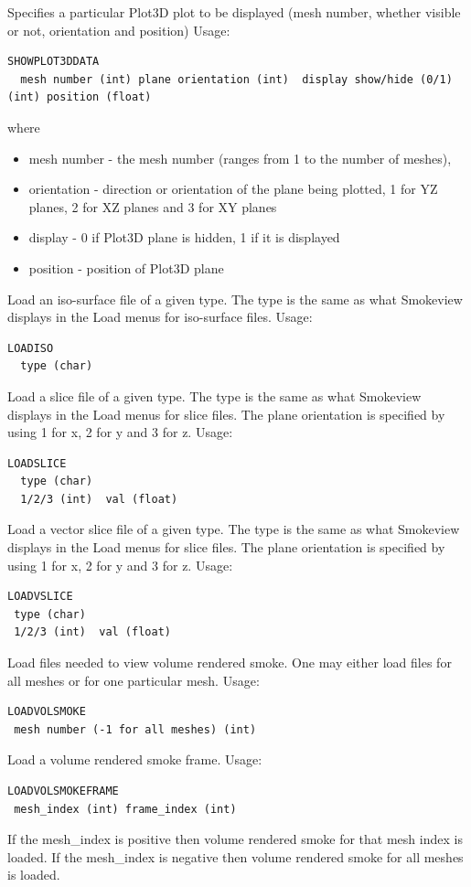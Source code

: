 \documentclass[11pt,twoside]{book}
\newcommand{\hitem}[1]{\item[{\bf #1} \hfill]}
\begin{document}
\hitem{SHOWPLOT3DDATA}Specifies a particular Plot3D plot to be displayed (mesh number, whether visible or not, orientation and position)
Usage:
\begin{lstlisting}
SHOWPLOT3DDATA
  mesh number (int) plane orientation (int)  display show/hide (0/1) (int) position (float)
\end{lstlisting}
where
\begin{itemize}
\item mesh number - the mesh number (ranges from 1 to the number of meshes),
\item orientation - direction or orientation of the plane being plotted, 1 for YZ planes, 2 for XZ planes and 3 for XY planes
\item display - 0 if Plot3D plane is hidden, 1 if it is displayed
\item position - position of Plot3D plane
\end{itemize}

\hitem{LOADISO}Load an iso-surface file of a given type.  The type is the same as what Smokeview displays in the Load menus for iso-surface files.
Usage:
\begin{lstlisting}
LOADISO
  type (char)
\end{lstlisting}

\hitem{LOADSLICE}Load a slice file of a given type.  The type is the same as what Smokeview displays in the Load menus for slice files.  The plane orientation is specified by using 1 for x, 2 for y and 3 for z.
Usage:
\begin{lstlisting}
LOADSLICE
  type (char)
  1/2/3 (int)  val (float)
\end{lstlisting}

\hitem{LOADVSLICE}Load a vector slice file of a given type.  The type is the same as what Smokeview displays in the Load menus for slice files.  The plane orientation is specified by using 1 for x, 2 for y and 3 for z.
Usage:
\begin{lstlisting}
LOADVSLICE
 type (char)
 1/2/3 (int)  val (float)
\end{lstlisting}

\hitem{LOADVOLSMOKE} Load files needed to view volume rendered
smoke.  One may either load files for all meshes or for one
particular mesh.  Usage:
\begin{lstlisting}
LOADVOLSMOKE
 mesh number (-1 for all meshes) (int)
 \end{lstlisting}


\hitem{LOADVOLSMOKEFRAME} Load a volume rendered smoke frame.
Usage:
\begin{lstlisting}
LOADVOLSMOKEFRAME
 mesh_index (int) frame_index (int)
\end{lstlisting}
If the mesh\_index is positive then volume rendered smoke for that
mesh index is loaded. If the mesh\_index is negative then volume
rendered smoke for all meshes is loaded.
\end{document}
